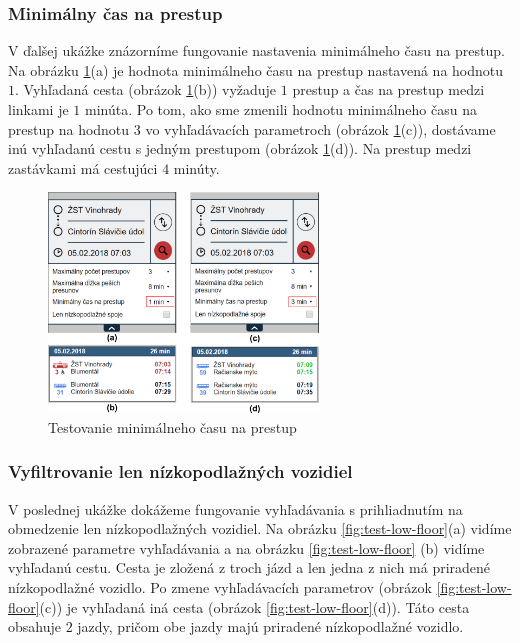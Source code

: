\subsubsection{Minimálny čas na prestup}

V ďalšej ukážke znázorníme fungovanie nastavenia minimálneho času na prestup. Na obrázku \ref{fig:test-min-transfer}(a) je hodnota minimálneho času na prestup nastavená na hodnotu $1$. Vyhľadaná cesta (obrázok \ref{fig:test-min-transfer}(b)) vyžaduje $1$ prestup a čas na prestup medzi linkami je $1$ minúta. Po tom, ako sme zmenili hodnotu minimálneho času na prestup na hodnotu $3$ vo vyhľadávacích parametroch (obrázok \ref{fig:test-min-transfer}(c)), dostávame inú vyhľadanú cestu s jedným prestupom (obrázok \ref{fig:test-min-transfer}(d)). Na prestup medzi zastávkami má cestujúci $4$ minúty.

\begin{figure}[H]
\centerline{\includegraphics[width=0.64\textwidth]{images/test/min-transfer}}
\caption[Testovanie minimálneho času na prestup]{Testovanie minimálneho času na prestup}
\label{fig:test-min-transfer}
\end{figure}


\subsubsection{Vyfiltrovanie len nízkopodlažných vozidiel}
V poslednej ukážke dokážeme fungovanie vyhľadávania s prihliadnutím na obmedzenie len nízkopodlažných vozidiel. Na obrázku \ref{fig:test-low-floor}(a) vidíme zobrazené parametre vyhľadávania a na obrázku \ref{fig:test-low-floor} (b) vidíme vyhľadanú cestu. Cesta je zložená z troch jázd a len jedna z nich má priradené nízkopodlažné vozidlo. Po zmene vyhľadávacích parametrov (obrázok \ref{fig:test-low-floor}(c)) je vyhľadaná iná cesta (obrázok \ref{fig:test-low-floor}(d)). Táto cesta obsahuje $2$ jazdy, pričom obe jazdy majú priradené nízkopodlažné vozidlo.

